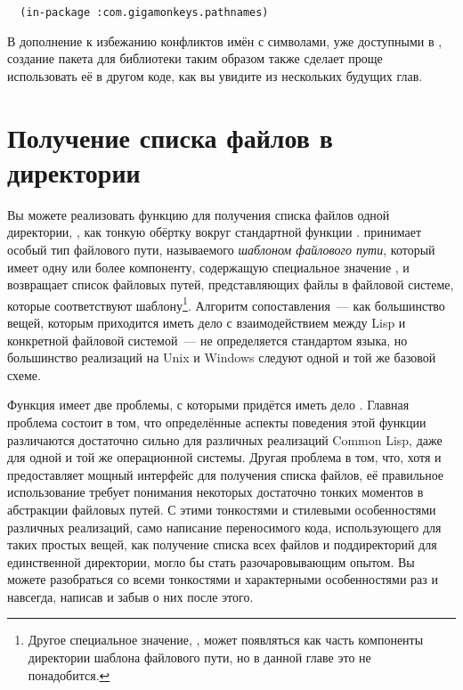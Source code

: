 \begin{lstlisting}
  (in-package :com.gigamonkeys.pathnames)
\end{lstlisting}

В дополнение к избежанию конфликтов имён с символами, уже доступными в ,
создание пакета для библиотеки таким образом также сделает проще использовать её в другом
коде, как вы увидите из нескольких будущих глав.


\section{Получение списка файлов в директории}

Вы можете реализовать функцию для получения списка файлов одной директории,
, как тонкую обёртку вокруг стандартной функции
.  принимает особый тип файлового пути, называемого
\textit{шаблоном файлового пути}, который имеет одну или более компоненту, содержащую
специальное значение , и возвращает список файловых путей, представляющих
файлы в файловой системе, которые соответствуют шаблону\footnote{Другое специальное
  значение, , может появляться как часть компоненты директории
  шаблона файлового пути, но в данной главе это не понадобится.}. Алгоритм сопоставления~---
как большинство вещей, которым приходится иметь дело с взаимодействием между Lisp и
конкретной файловой системой~--- не определяется стандартом языка, но большинство реализаций
на Unix и Windows следуют одной и той же базовой схеме.

Функция  имеет две проблемы, с которыми придётся иметь дело
. Главная проблема состоит в том, что определённые аспекты поведения
этой функции различаются достаточно сильно для различных реализаций Common Lisp, даже для
одной и той же операционной системы. Другая проблема в том, что, хотя  и
предоставляет мощный интерфейс для получения списка файлов, её правильное использование
требует понимания некоторых достаточно тонких моментов в абстракции файловых путей. С
этими тонкостями и стилевыми особенностями различных реализаций, само написание
переносимого кода, использующего  для таких простых вещей, как получение
списка всех файлов и поддиректорий для единственной директории, могло бы стать
разочаровывающим опытом. Вы можете разобраться со всеми тонкостями и характерными
особенностями раз и навсегда, написав  и забыв о них после этого.

